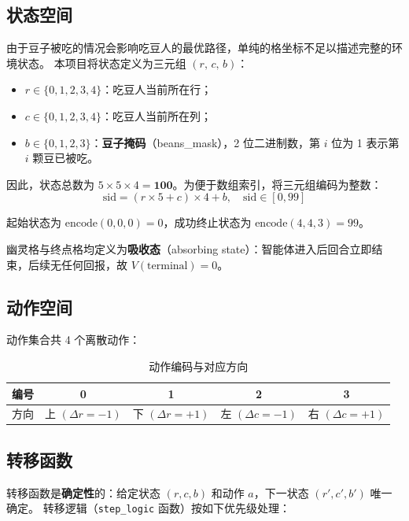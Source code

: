 \documentclass[12pt,a4paper]{ctexart}
\begin{document}
\subsection{状态空间}

由于豆子被吃的情况会影响吃豆人的最优路径，单纯的格坐标不足以描述完整的环境状态。
本项目将状态定义为三元组 $(r,\,c,\,b)$：
\begin{itemize}
    \item $r \in \{0,1,2,3,4\}$：吃豆人当前所在行；
    \item $c \in \{0,1,2,3,4\}$：吃豆人当前所在列；
    \item $b \in \{0,1,2,3\}$：\textbf{豆子掩码}（beans\_mask），2 位二进制数，第 $i$ 位为 1 表示第 $i$ 颗豆已被吃。
\end{itemize}

因此，状态总数为 $5 \times 5 \times 4 = \mathbf{100}$。为便于数组索引，将三元组编码为整数：
\begin{equation}
    \text{sid} = (r \times 5 + c) \times 4 + b, \quad \text{sid} \in [0, 99]
\end{equation}

起始状态为 $\text{encode}(0,0,0) = 0$，成功终止状态为 $\text{encode}(4,4,3) = 99$。

幽灵格与终点格均定义为\textbf{吸收态}（absorbing state）：智能体进入后回合立即结束，后续无任何回报，故 $V(\text{terminal}) = 0$。

\subsection{动作空间}

动作集合共 4 个离散动作：

\begin{table}[H]
    \centering
    \begin{tabular}{ccccc}
        \toprule
        编号 & 0 & 1 & 2 & 3 \\
        \midrule
        方向 & 上 $(\Delta r=-1)$ & 下 $(\Delta r=+1)$ & 左 $(\Delta c=-1)$ & 右 $(\Delta c=+1)$ \\
        \bottomrule
    \end{tabular}
    \caption{动作编码与对应方向}
\end{table}

\subsection{转移函数}

转移函数是\textbf{确定性}的：给定状态 $(r,c,b)$ 和动作 $a$，下一状态 $(r',c',b')$ 唯一确定。
转移逻辑（\texttt{step\_logic} 函数）按如下优先级处理：
\end{document}
